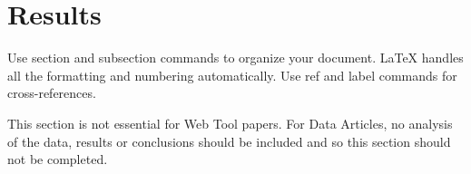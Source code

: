 \section*{Results}
Use section and subsection commands to organize your document. \LaTeX{} handles all the formatting and numbering automatically. Use ref and label commands for cross-references.

This section is not essential for Web Tool papers. 
For Data Articles, no analysis of the data, results or conclusions should be included and so this section should not be completed. 